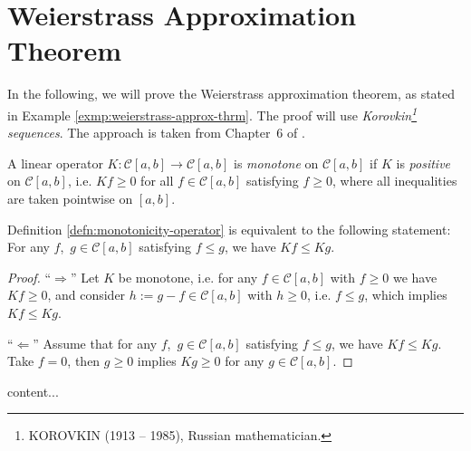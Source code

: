 \section{Weierstrass Approximation Theorem}\label{app:weierstrass-app-theorem}

In the following, we will prove the Weierstrass approximation theorem, as stated in Example \ref{exmp:weierstrass-approx-thrm}. The proof will use \textit{Korovkin\footnote{\textsc{KOROVKIN} (1913 -- 1985), Russian mathematician.} sequences}. The approach is taken from \mbox{Chapter 6} of \cite{iske:approximation}.

\begin{defn}\label{defn:monotonicity-operator}
	A linear operator $K: \mathcal C[a, b] \to \mathcal C[a, b]$ is \textit{monotone} on $\mathcal C[a, b]$ if $K$ is \textit{positive} on $\mathcal C[a, b]$, i.e. $Kf \geq 0$ for all $f\in \mathcal C[a, b]$ satisfying $f\geq 0$, where all inequalities are taken pointwise on $[a, b]$.
\end{defn}

\begin{remark}
	Definition \ref{defn:monotonicity-operator} is equivalent to the following statement: For any \mbox{$f$, $g\in\mathcal C[a, b]$} satisfying $f\leq g$, we have $Kf \leq Kg$.
\end{remark}

\begin{proof}
	\enquote{$\Longrightarrow$} Let $K$ be monotone, i.e. for any $f\in\mathcal C[a, b]$ with $f\geq 0$ we have $Kf \geq 0$, and consider $h := g - f \in \mathcal C[a, b]$ with $h\geq 0$, i.e. $f\leq g$, which implies $Kf\leq Kg$.
	
	\enquote{$\Longleftarrow$} Assume that for any \mbox{$f$, $g\in\mathcal C[a, b]$} satisfying $f\leq g$, we have $Kf \leq Kg$. Take $f = 0$, then $g\geq 0$ implies $Kg \geq 0$ for any $g\in\mathcal C[a, b]$.
\end{proof}

\begin{defn}
	content...
\end{defn}